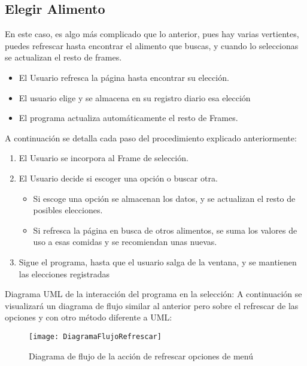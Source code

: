 \subsection{Elegir Alimento}
En este caso, es algo más complicado que lo anterior, pues hay varias vertientes, puedes refrescar hasta encontrar el alimento que buscas, y cuando lo seleccionas se actualizan el resto de frames.
\begin{itemize}
\item El Usuario refresca la página hasta encontrar su elección. 
\item El usuario elige y se almacena en su registro diario esa elección
\item El programa actualiza automáticamente el resto de Frames.
\end{itemize}
A continuación se detalla cada paso del procedimiento explicado anteriormente:
\begin{enumerate}
\item El Usuario se incorpora al Frame de selección.
\item El Usuario decide si escoger una opción o buscar otra.
\begin{itemize}
\item Si escoge una opción se almacenan los datos, y se actualizan el resto de posibles elecciones.
\item Si refresca la página en busca de otros alimentos, se suma los valores de uso a esas comidas y se recomiendan unas nuevas.
\end{itemize}
\item Sigue el programa, hasta que el usuario salga de la ventana, y se mantienen las elecciones registradas
\end{enumerate}
Diagrama UML de la interacción del programa en la selección:
A continuación se visualizará un diagrama de flujo  similar al anterior pero sobre el refrescar de las opciones y con otro método diferente a UML:
\begin{figure}[htb]
\centering
\texttt{[image: DiagramaFlujoRefrescar]} 
\caption{Diagrama de flujo de la acción de refrescar opciones de menú}
\end{figure}
